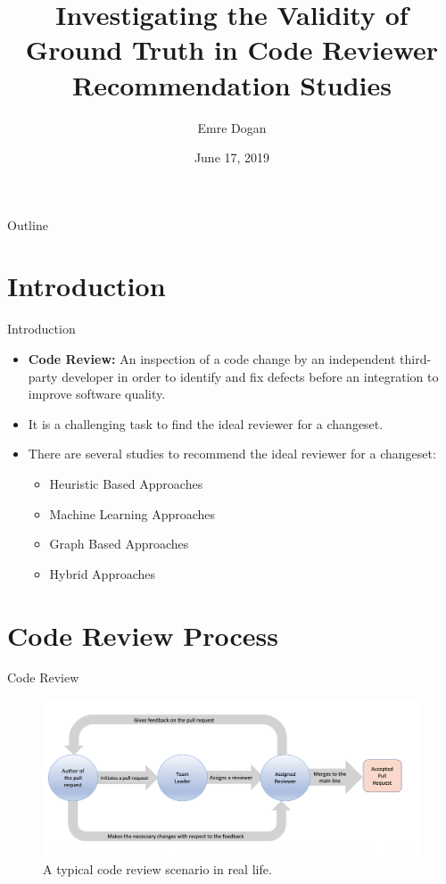 \documentclass{beamer}
\title[Paper Presentation]{Investigating the Validity of Ground Truth in Code Reviewer Recommendation Studies}
\author{Emre Dogan}
\institute{Bilkent University}
\date{June 17, 2019}
\begin{document}
\begin{frame}
  \titlepage
\end{frame}

\begin{frame}{Outline}
  \tableofcontents
\end{frame}
%
%


\section{Introduction}

\begin{frame}{Introduction}

\begin{itemize}
  \item \textbf{Code Review:} An inspection of a code change by an independent third-party
developer in order to identify and fix defects before an integration to
improve software quality\cite{whoshould}.
  \item It is a challenging task to find the ideal reviewer for a changeset.
  \item There are several studies to recommend the ideal reviewer for a changeset:
  \begin{itemize}
      \item Heuristic Based  Approaches
      \item Machine Learning Approaches
      \item Graph Based Approaches
      \item Hybrid Approaches
  \end{itemize}
\end{itemize}

\vskip 1cm
\end{frame}
%
%
\section{Code Review Process}
\begin{frame}{Code Review}
    \begin{figure}
    \includegraphics[width=\textwidth]{review.png}
    \caption{\label{fig:your-figure}A typical code review scenario in real life.}
    \end{figure}
\end{frame}
\end{document}
